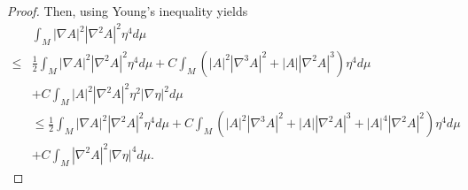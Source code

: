 \documentclass{amsart}
\theoremstyle{definition}
\numberwithin{equation}{section}
\begin{document}
\begin{proof}
Then, using Young's inequality yields
\begin{align}\label{E3.1.3}
        & \int_{M} |\nabla A|^2 |\nabla^2 A |^2 \eta^4  d\mu\\
        \leq &\frac 1 2 \int_{M} |\nabla A|^2 |\nabla^2 A |^2 \eta^4  d\mu +C\int_{M}( |A|^2 |\nabla^{3} A|^2 +|A| |\nabla^2 A|^3)  \eta^4
       d\mu \nonumber \\
       &+C\int_{M} |A|^2 |\nabla^2 A |^2\eta^2 |\nabla \eta|^2 d\mu
      \nonumber\\
      &\leq \frac 1 2 \int_{M} |\nabla A|^2 |\nabla^2 A |^2 \eta^4  d\mu + C\int_{M}( |A|^2 |\nabla^{3} A|^2 +|A| |\nabla^2 A|^3 +|A|^4|\nabla^2 A|^2)  \eta^4
       d\mu \nonumber \\
       & +C\int_{M}  |\nabla^2 A |^2  |\nabla \eta|^4 d\mu
      \nonumber.
\end{align}





\end{proof}
\end{document}
